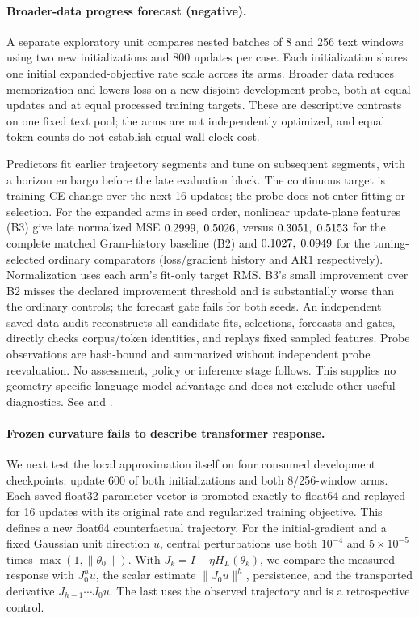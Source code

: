 \documentclass[11pt,letterpaper]{article}
\begin{document}
\paragraph{Broader-data progress forecast (negative).} A separate exploratory unit compares nested batches
of 8 and 256 text windows using two new initializations and 800 updates per case. Each initialization shares
one initial expanded-objective rate scale across its arms. Broader data reduces memorization and lowers loss on
a new disjoint development probe, both at equal updates and at equal processed training targets. These are
descriptive contrasts on one fixed text pool; the arms are not independently optimized, and equal token counts
do not establish equal wall-clock cost.

Predictors fit earlier trajectory segments and tune on subsequent segments, with a horizon embargo before
the late evaluation block. The continuous target is training-CE change over the next 16 updates; the probe
does not enter fitting or selection. For the expanded arms in seed order, nonlinear update-plane features
(B3) give late normalized MSE $0.2999,\; 0.5026$, versus $0.3051,\; 0.5153$ for the complete matched
Gram-history baseline (B2) and $0.1027,\; 0.0949$ for the tuning-selected ordinary comparators
(loss/gradient history and AR1 respectively). Normalization uses each arm's fit-only target RMS.
B3's small improvement over B2 misses the declared improvement threshold and is substantially worse than
the ordinary controls; the forecast gate fails for both seeds. An independent saved-data audit reconstructs
all candidate fits, selections, forecasts and gates, directly checks corpus/token identities, and replays
fixed sampled features. Probe observations are hash-bound and summarized without independent probe
reevaluation. No assessment, policy or inference stage follows. This supplies no geometry-specific
language-model advantage and does not exclude other useful diagnostics. See
 and
.

\paragraph{Frozen curvature fails to describe transformer response.}
We next test the local approximation itself on four consumed development checkpoints: update 600 of
both initializations and both 8/256-window arms. Each saved float32 parameter vector is promoted exactly
to float64 and replayed for 16 updates with its original rate and regularized training objective.
This defines a new float64 counterfactual trajectory. For the initial-gradient and a fixed Gaussian
unit direction $u$, central perturbations use both $10^{-4}$ and $5\times10^{-5}$ times
$\max(1,\|\theta_0\|)$. With $J_k=I-\eta H_L(\theta_k)$, we compare the measured response with
$J_0^h u$, the scalar estimate $\|J_0u\|^h$, persistence, and the transported derivative
$J_{h-1}\cdots J_0u$. The last uses the observed trajectory and is a retrospective control.
\end{document}
